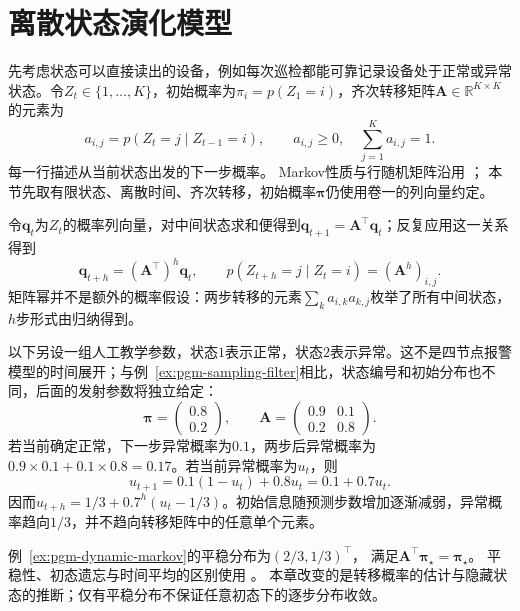 \section{离散状态演化模型}
\label{sec:pgm-dynamic-discrete}

先考虑状态可以直接读出的设备，例如每次巡检都能可靠记录设备处于正常或异常状态。令$Z_t\in\{1,\ldots,K\}$，初始概率为$\pi_i=p(Z_1=i)$，齐次转移矩阵$\bm{A}\in\mathbb{R}^{K\times K}$的元素为
\[
  a_{i,j}=p(Z_t=j\mid Z_{t-1}=i),\qquad
  a_{i,j}\geq0,\quad \sum_{j=1}^{K}a_{i,j}=1.
\]
每一行描述从当前状态出发的下一步概率。
Markov性质与行随机矩阵沿用
；
本节先取有限状态、离散时间、齐次转移，初始概率$\bm\pi$仍使用卷一的列向量约定。

令$\bm{q}_t$为$Z_t$的概率列向量，对中间状态求和便得到$\bm{q}_{t+1}=\bm{A}^{\top}\bm{q}_t$；反复应用这一关系得到
\begin{equation}
  \bm{q}_{t+h}=(\bm{A}^{\top})^h\bm{q}_t,\qquad
  p(Z_{t+h}=j\mid Z_t=i)=(\bm{A}^h)_{i,j}.
  \label{eq:pgm-dynamic-markov-prediction}
\end{equation}
矩阵幂并不是额外的概率假设：两步转移的元素$\sum_k a_{i,k}a_{k,j}$枚举了所有中间状态，$h$步形式由归纳得到。

\begin{example}[两状态设备的多步预测]
  \label{ex:pgm-dynamic-markov}
  以下另设一组人工教学参数，状态$1$表示正常，状态$2$表示异常。这不是四节点报警模型的时间展开；与例~\ref{ex:pgm-sampling-filter}相比，状态编号和初始分布也不同，后面的发射参数将独立给定：
  \[
    \bm{\pi}=\begin{pmatrix}0.8\\0.2\end{pmatrix},\qquad
    \bm{A}=
    \begin{pmatrix}0.9&0.1\\0.2&0.8\end{pmatrix}.
  \]
  若当前确定正常，下一步异常概率为$0.1$，两步后异常概率为$0.9\times0.1+0.1\times0.8=0.17$。若当前异常概率为$u_t$，则
  \[
    u_{t+1}=0.1(1-u_t)+0.8u_t=0.1+0.7u_t.
  \]
  因而$u_{t+h}=1/3+0.7^h(u_t-1/3)$。初始信息随预测步数增加逐渐减弱，异常概率趋向$1/3$，并不趋向转移矩阵中的任意单个元素。
\end{example}

例~\ref{ex:pgm-dynamic-markov}的平稳分布为$(2/3,1/3)^\top$，
满足$\bm A^\top\bm\pi_\star=\bm\pi_\star$。
平稳性、初态遗忘与时间平均的区别使用
。
本章改变的是转移概率的估计与隐藏状态的推断；仅有平稳分布不保证任意初态下的逐步分布收敛。

